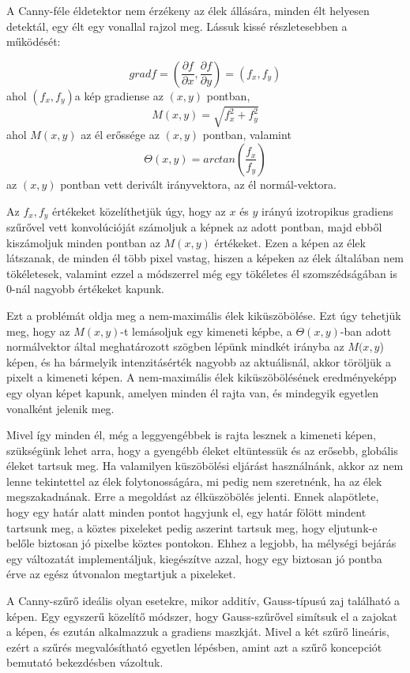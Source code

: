 \documentclass[a4paper,12pt]{article}
\begin{document}
A Canny-féle éldetektor nem érzékeny az élek állására, minden élt helyesen
detektál, egy élt egy vonallal rajzol meg.
Lássuk kissé részletesebben a működését: 

$$grad f =\left( \frac{\partial f}{\partial x}, \frac{\partial f}{\partial y}
\right) = (f_x,f_y)$$
ahol $(f_x,f_y)$a kép gradiense az $(x,y)$ pontban,
$$M(x,y)=\sqrt{f_x^2+f_y^2}$$
ahol $M(x,y)$ az él erőssége az $(x,y)$ pontban, valamint 
$$\Theta(x,y)=arctan\left( \frac{f_x}{f_y} \right)$$
az $(x,y)$ pontban vett derivált irányvektora, az él normál-vektora.

Az $f_x, f_y$ értékeket közelíthetjük úgy, hogy az $x$ és $y$ irányú izotropikus
gradiens szűrővel vett konvolúcióját számoljuk a képnek az adott pontban, majd
ebből kiszámoljuk minden pontban az $M(x,y)$ értékeket. Ezen a képen az élek
látszanak, de minden él több pixel vastag, hiszen a képeken az élek általában
nem tökéletesek, valamint ezzel a módszerrel még egy tökéletes él
szomszédságában is 0-nál nagyobb értékeket kapunk.

Ezt a problémát oldja meg a nem-maximális élek kiküszöbölése. Ezt úgy tehetjük
meg, hogy az $M(x,y)$-t lemásoljuk egy kimeneti képbe, a $\Theta(x,y)$-ban adott
normálvektor által meghatározott szögben lépünk mindkét irányba az $M(x,y$)
képen, és ha bármelyik intenzitásérték nagyobb az aktuálisnál, akkor töröljük a
pixelt a kimeneti képen. A nem-maximális élek kiküszöbölésének eredményeképp egy
olyan képet kapunk, amelyen minden él rajta van, és mindegyik egyetlen vonalként
jelenik meg.


Mivel így minden él, még a leggyengébbek is rajta lesznek a kimeneti képen,
szükségünk lehet arra, hogy a gyengébb éleket eltüntessük és az erősebb,
globális éleket tartsuk meg. Ha valamilyen küszöbölési eljárást használnánk,
akkor az nem lenne tekintettel az élek folytonosságára, mi pedig nem szeretnénk,
ha az élek megszakadnának. Erre a megoldást az élküszöbölés jelenti. Ennek
alapötlete, hogy egy határ alatt minden pontot hagyjunk el, egy határ fölött
mindent tartsunk meg, a köztes pixeleket pedig aszerint tartsuk meg, hogy
eljutunk-e belőle biztosan jó pixelbe köztes pontokon. Ehhez a legjobb, ha
mélységi bejárás egy változatát implementáljuk, kiegészítve azzal, hogy egy
biztosan jó pontba érve az egész útvonalon megtartjuk a pixeleket.

A Canny-szűrő ideális olyan esetekre, mikor additív, Gauss-típusú zaj található
a képen. Egy egyszerű közelítő módszer, hogy Gauss-szűrővel simítsuk el a
zajokat a képen, és ezután alkalmazzuk a gradiens maszkját. Mivel a két szűrő
lineáris, ezért a szűrés megvalósítható egyetlen lépésben, amint azt a szűrő
koncepciót bemutató bekezdésben vázoltuk.
\end{document}
